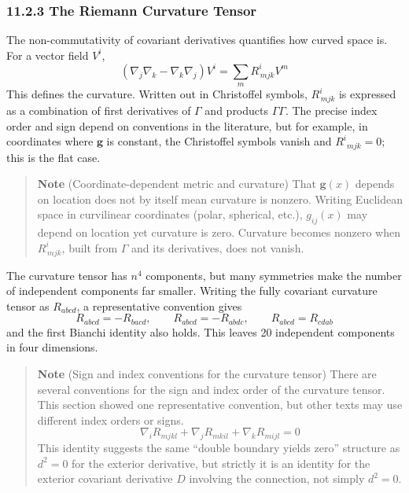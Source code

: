 \documentclass[a4paper,12pt,openany]{book}
\begin{document}
\hypertarget{the-riemann-curvature-tensor}{%
\subsubsection{11.2.3 The Riemann Curvature
Tensor}\label{the-riemann-curvature-tensor}}

The non-commutativity of covariant derivatives quantifies how curved
space is. For a vector field \(V^i\),
\[(\nabla_j \nabla_k - \nabla_k \nabla_j) V^i = \sum_m R^i_{\,mjk} V^m\]
This defines the curvature. Written out in Christoffel symbols,
\(R^i_{\,mjk}\) is expressed as a combination of first derivatives of
\(\Gamma\) and products \(\Gamma\Gamma\). The precise index order and
sign depend on conventions in the literature, but for example, in
coordinates where \(\mathbf g\) is constant, the Christoffel symbols
vanish and \(R^i{}_{mjk}=0\); this is the flat case.

\begin{quote}
\textbf{Note} (Coordinate-dependent metric and curvature) That
\(\mathbf{g}(x)\) depends on location does not by itself mean curvature
is nonzero. Writing Euclidean space in curvilinear coordinates (polar,
spherical, etc.), \(g_{ij}(x)\) may depend on location yet curvature is
zero. Curvature becomes nonzero when \(R^i_{\,mjk}\), built from
\(\Gamma\) and its derivatives, does not vanish.
\end{quote}

The curvature tensor has \(n^4\) components, but many symmetries make
the number of independent components far smaller. Writing the fully
covariant curvature tensor as \(R_{abcd}\), a representative convention
gives
\[R_{abcd}=-R_{bacd},\qquad R_{abcd}=-R_{abdc},\qquad R_{abcd}=R_{cdab}\]
and the first Bianchi identity also holds. This leaves 20 independent
components in four dimensions.

\begin{quote}
\textbf{Note} (Sign and index conventions for the curvature tensor)
There are several conventions for the sign and index order of the
curvature tensor. This section showed one representative convention, but
other texts may use different index orders or signs. \[
\nabla_i R_{mjkl}+\nabla_j R_{mkil}+\nabla_k R_{mijl}=0
\] This identity suggests the same ``double boundary yields zero''
structure as \(d^2=0\) for the exterior derivative, but strictly it is
an identity for the exterior covariant derivative \(D\) involving the
connection, not simply \(d^2=0\).
\end{quote}
\end{document}

